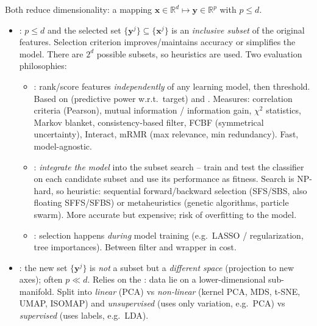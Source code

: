 Both reduce dimensionality: a mapping $\mathbf{x}\in\mathbb{R}^d \mapsto
\mathbf{y}\in\mathbb{R}^p$ with $p\le d$.

\begin{itemize}
\item {}: $p\le d$ and the selected set
      $\{\mathbf{y}^j\}\subseteq\{\mathbf{x}^j\}$ is an \emph{inclusive subset} of
      the original features. Selection criterion improves/maintains accuracy or
      simplifies the model. There are $2^d$ possible subsets, so heuristics are
      used. Two evaluation philosophies:
      \begin{itemize}
      \item {}: rank/score features \emph{independently} of any
            learning model, then threshold. Based on  (predictive
            power w.r.t.\ target) and . Measures: correlation
            criteria (Pearson), mutual information / information gain,
            $\chi^2$ statistics, Markov blanket, consistency-based filter, FCBF
            (symmetrical uncertainty), Interact, mRMR (max relevance, min
            redundancy). Fast, model-agnostic.
      \item {}: \emph{integrate the model} into the subset
            search -- train and test the classifier on each candidate subset and
            use its performance as fitness. Search is NP-hard, so heuristic:
            sequential forward/backward selection (SFS/SBS, also floating
            SFFS/SFBS) or metaheuristics (genetic algorithms, particle swarm).
            More accurate but expensive; risk of overfitting to the model.
      \item {}: selection happens \emph{during} model
            training (e.g.\ LASSO / regularization, tree importances). Between
            filter and wrapper in cost.
      \end{itemize}
\item {}: the new set $\{\mathbf{y}^j\}$ is \emph{not} a
      subset but a \emph{different space} (projection to new axes); often
      $p\ll d$. Relies on the : data lie on a
      lower-dimensional sub-manifold. Split into \emph{linear} (PCA) vs
      \emph{non-linear} (kernel PCA, MDS, t-SNE, UMAP, ISOMAP) and
      \emph{unsupervised} (uses only variation, e.g.\ PCA) vs \emph{supervised}
      (uses labels, e.g.\ LDA).
\end{itemize}


